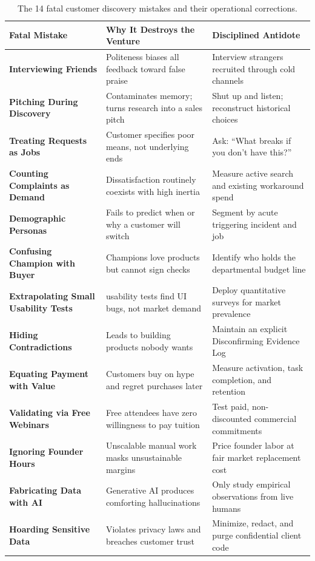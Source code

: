 \begin{table}[t]
\centering
\small
\begin{tabularx}{\textwidth}{>{\RaggedRight\bfseries}p{3.2cm} >{\RaggedRight}X >{\RaggedRight}X}
\toprule
Fatal Mistake & Why It Destroys the Venture & Disciplined Antidote \\
\midrule
Interviewing Friends & Politeness biases all feedback toward false praise & Interview strangers recruited through cold channels \\
\addlinespace
Pitching During Discovery & Contaminates memory; turns research into a sales pitch & Shut up and listen; reconstruct historical choices \\
\addlinespace
Treating Requests as Jobs & Customer specifies poor means, not underlying ends & Ask: ``What breaks if you don't have this?'' \\
\addlinespace
Counting Complaints as Demand & Dissatisfaction routinely coexists with high inertia & Measure active search and existing workaround spend \\
\addlinespace
Demographic Personas & Fails to predict when or why a customer will switch & Segment by acute triggering incident and job \\
\addlinespace
Confusing Champion with Buyer & Champions love products but cannot sign checks & Identify who holds the departmental budget line \\
\addlinespace
Extrapolating Small Usability Tests & 5 usability tests find UI bugs, not market demand & Deploy quantitative surveys for market prevalence \\
\addlinespace
Hiding Contradictions & Leads to building products nobody wants & Maintain an explicit Disconfirming Evidence Log \\
\addlinespace
Equating Payment with Value & Customers buy on hype and regret purchases later & Measure activation, task completion, and retention \\
\addlinespace
Validating via Free Webinars & Free attendees have zero willingness to pay tuition & Test paid, non-discounted commercial commitments \\
\addlinespace
Ignoring Founder Hours & Unscalable manual work masks unsustainable margins & Price founder labor at fair market replacement cost \\
\addlinespace
Fabricating Data with AI & Generative AI produces comforting hallucinations & Only study empirical observations from live humans \\
\addlinespace
Hoarding Sensitive Data & Violates privacy laws and breaches customer trust & Minimize, redact, and purge confidential client code \\
\bottomrule
\end{tabularx}
\caption{The 14 fatal customer discovery mistakes and their operational corrections.}
\label{tab:ch6_fourteen_mistakes}
\end{table}

